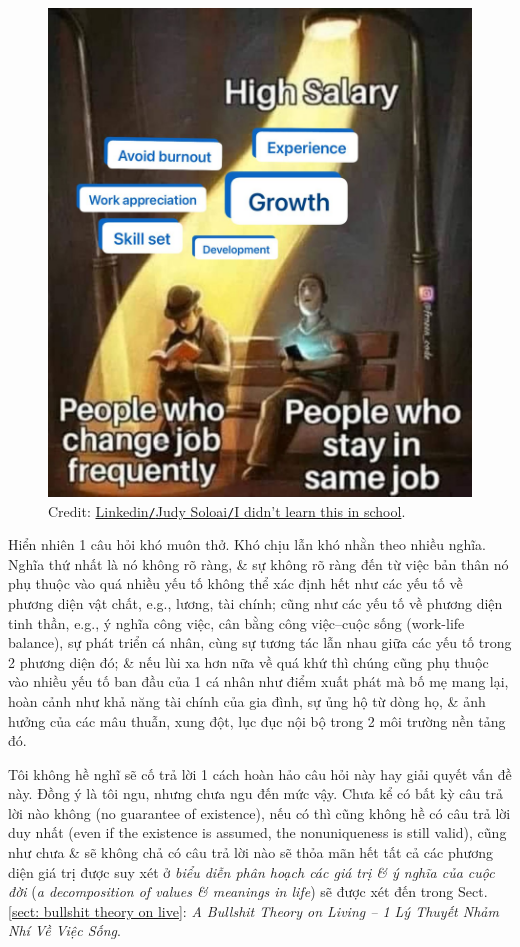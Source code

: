 \documentclass[12pt]{article}
\begin{document}
\begin{figure}[H]
	\centering
	\includegraphics[width = 15cm]{high_salary}
	\caption{Credit: \href{https://www.linkedin.com/posts/judy-soloai_i-didnt-learn-this-in-school-i-learned-activity-7089014937494179840-jTze/}{Linkedin{\tt/}Judy Soloai{\tt/}I didn't learn this in school}.}
\end{figure}
Hiển nhiên 1 câu hỏi khó muôn thở. Khó chịu lẫn khó nhằn theo nhiều nghĩa. Nghĩa thứ nhất là nó không rõ ràng, \& sự không rõ ràng đến từ việc bản thân nó phụ thuộc vào quá nhiều yếu tố không thể xác định hết như các yếu tố về phương diện vật chất, e.g., lương, tài chính; cũng như các yếu tố về phương diện tinh thần, e.g., ý nghĩa công việc, cân bằng công việc--cuộc sống (work-life balance), sự phát triển cá nhân, cùng sự tương tác lẫn nhau giữa các yếu tố trong 2 phương diện đó; \& nếu lùi xa hơn nữa về quá khứ thì chúng cũng phụ thuộc vào nhiều yếu tố ban đầu của 1 cá nhân như điểm xuất phát mà bố mẹ mang lại, hoàn cảnh như khả năng tài chính của gia đình, sự ủng hộ từ dòng họ, \& ảnh hưởng của các mâu thuẫn, xung đột, lục đục nội bộ trong 2 môi trường nền tảng đó.

Tôi không hề nghĩ sẽ cố trả lời 1 cách hoàn hảo câu hỏi này hay giải quyết vấn đề này. Đồng ý là tôi ngu, nhưng chưa ngu đến mức vậy. Chưa kể có bất kỳ câu trả lời nào không (no guarantee of existence), nếu có thì cũng không hề có câu trả lời duy nhất (even if the existence is assumed, the nonuniqueness is still valid), cũng như chưa \& sẽ không chả có câu trả lời nào sẽ thỏa mãn hết tất cả các phương diện giá trị được suy xét ở {\it biểu diễn phân hoạch các giá trị \& ý nghĩa của cuộc đời} ({\it a decomposition of values \& meanings in life}) sẽ được xét đến trong Sect. \ref{sect: bullshit theory on live}: {\it A Bullshit Theory on Living -- 1 Lý Thuyết Nhảm Nhí Về Việc Sống}.
\end{document}
